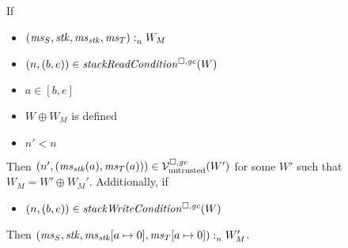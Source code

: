 \begin{lemma}
  \label{lem:stackreadcond-stackwritecond-work}
  If
  \begin{itemize}
  \item $\memSat{(\ms_S,\stk,\ms_\stk,\ms_T)}{W_M}$
  \item $\npair{(b,e)}\in\stackReadCond{W}$
  \item $a \in [b,e]$
  \item $W \oplus W_M$ is defined
  \item $n' < n$
  \end{itemize}
  Then $\npair[n']{(\ms_\stk(a),\ms_T(a))} \in \lrv(W')$ for some $W'$ such that $W_M = W' \oplus W_M'$.
  Additionally, if
  \begin{itemize}
  \item $\npair{(b,e)}\in\stackWriteCond{W}$
  \end{itemize}
  Then $\memSat{(\ms_S,\stk,\ms_\stk[a\mapsto 0],\ms_T[a\mapsto 0])}{W_M'}$.
\end{lemma}
